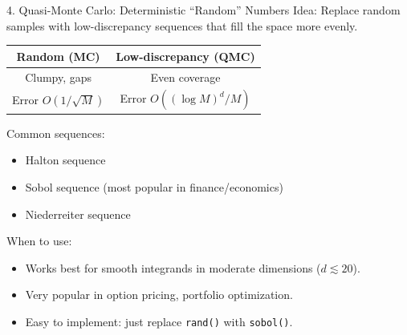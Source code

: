 \documentclass[aspectratio=169]{beamer}
\newcommand{\1}{\mathbf{1}}
\begin{document}
\begin{frame}{4. Quasi-Monte Carlo: Deterministic ``Random'' Numbers}
\small
Idea: Replace random samples with low-discrepancy sequences that fill the space more evenly.

\begin{center}
\begin{tabular}{cc}
Random (MC) & Low-discrepancy (QMC) \\
\hline
Clumpy, gaps & Even coverage \\
Error $O(1/\sqrt{M})$ & Error $O((\log M)^d / M)$ \\
\end{tabular}
\end{center}

Common sequences:
\begin{itemize}\setlength{\itemsep}{1mm}
    \item Halton sequence
    \item Sobol sequence (most popular in finance/economics)
    \item Niederreiter sequence
\end{itemize}

When to use:
\begin{itemize}\setlength{\itemsep}{1mm}
    \item Works best for smooth integrands in moderate dimensions ($d \lesssim 20$).
    \item Very popular in option pricing, portfolio optimization.
    \item Easy to implement: just replace \texttt{rand()} with \texttt{sobol()}.
\end{itemize}
\end{frame}



%  
\end{document}
